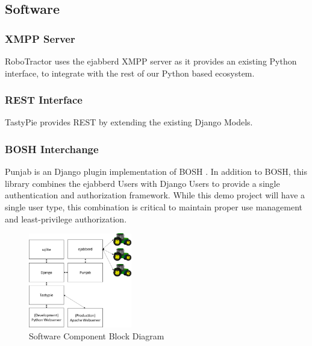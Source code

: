 \documentclass[conference,12pt]{IEEEtran}
\begin{document}
\subsection{Software}
\subsubsection{XMPP Server}
RoboTractor uses the ejabberd \autocite{_ejabberd} XMPP server as it provides an existing Python
interface, to integrate with the rest of our Python based ecosystem.
\subsubsection{REST Interface}
TastyPie provides REST \autocite{_toastdriven/django-tastypie_2014} by extending
the existing Django Models.
\subsubsection{BOSH Interchange}
Punjab is an Django plugin implementation of BOSH
\autocite{_twonds/punjab_2014}.  In addition to BOSH, this library combines
the ejabberd Users with Django Users to provide a single authentication and
authorization framework. While this demo project will have a single user type,
this combination is critical to maintain proper use management and
least-privilege authorization.

\begin{figure}
\centering
\includegraphics[width=0.4\textwidth]{SoftwareComponentBlockDiagram.pdf}
\caption{Software Component Block Diagram}
\label{fig:softwarecomponents}
\end{figure}
\end{document}
